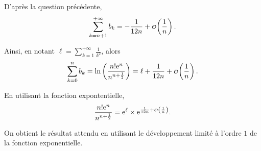 \begin{elemdemo}
\begin{reponses}
\item D'après la question précédente,
\[
\sum_{k=n+1}^{+\infty} b_k = -\frac{1}{12 n} + \petito\mathopen{}\left(\frac{1}{n}\right).
\]

Ainsi, en notant $\ell = \sum_{k=1}^{+\infty} \frac{1}{k^2}$, alors
\[
\sum_{k=0}^n b_k = \ln\left(\frac{n! \e^n}{n^{n+\frac{1}{2}}}\right) = \ell + \frac{1}{12 n} + \petito\mathopen{}\left(\frac{1}{n}\right).
\]

En utilisant la fonction expontentielle,
\[
\frac{n! \e^n}{n^{n+\frac{1}{2}}} = \e^{\ell} \times \e^{\frac{1}{12 n} + \petito\mathopen{}\left(\frac{1}{n}\right)}.
\]

On obtient le résultat attendu en utilisant le développement limité à l'ordre $1$ de la fonction exponentielle.
\end{reponses}
\end{elemdemo}

